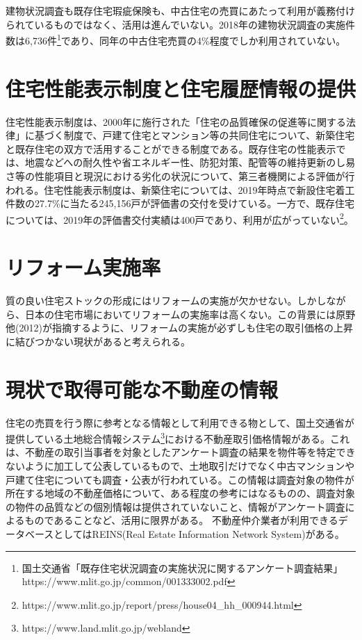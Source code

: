 \documentclass[a4paper,fontsize=11pt,report,notitlepage,line_length=38zw,number_of_lines=40]{jlreq}
\begin{document}
建物状況調査も既存住宅瑕疵保険も、中古住宅の売買にあたって利用が義務付けられているものではなく、活用は進んでいない。2018年の建物状況調査の実施件数は6,736件\footnote{国土交通省「既存住宅状況調査の実施状況に関するアンケート調査結果」https://www.mlit.go.jp/common/001333002.pdf}であり、同年の中古住宅売買の4\%程度でしか利用されていない。

\section{住宅性能表示制度と住宅履歴情報の提供}
住宅性能表示制度は、2000年に施行された「住宅の品質確保の促進等に関する法律」に基づく制度で、戸建て住宅とマンション等の共同住宅について、新築住宅と既存住宅の双方で活用することができる制度である。既存住宅の性能表示では、地震などへの耐久性や省エネルギー性、防犯対策、配管等の維持更新のし易さ等の性能項目と現況における劣化の状況について、第三者機関による評価が行われる。住宅性能表示制度は、新築住宅については、2019年時点で新設住宅着工件数の27.7\%に当たる245,156戸が評価書の交付を受けている。一方で、既存住宅については、2019年の評価書交付実績は400戸であり、利用が広がっていない\footnote{https://www.mlit.go.jp/report/press/house04\_hh\_000944.html}。


\section{リフォーム実施率}
質の良い住宅ストックの形成にはリフォームの実施が欠かせない。しかしながら、日本の住宅市場においてリフォームの実施率は高くない。この背景には原野他(2012)が指摘するように、リフォームの実施が必ずしも住宅の取引価格の上昇に結びつかない現状があると考えられる。


\section{現状で取得可能な不動産の情報}
住宅の売買を行う際に参考となる情報として利用できる物として、国土交通省が提供している土地総合情報システム\footnote{https://www.land.mlit.go.jp/webland}における不動産取引価格情報がある。これは、不動産の取引当事者を対象としたアンケート調査の結果を物件等を特定できないように加工して公表しているもので、土地取引だけでなく中古マンションや戸建て住宅についても調査・公表が行われている。この情報は調査対象の物件が所在する地域の不動産価格について、ある程度の参考にはなるものの、調査対象の物件の品質などの個別情報は提供されていないこと、情報がアンケート調査によるものであることなど、活用に限界がある。
不動産仲介業者が利用できるデータベースとしてはREINS(Real Estate Information Network System)がある。
\end{document}
